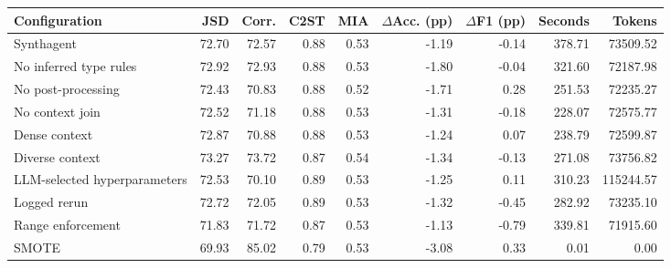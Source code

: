 \begin{tabular}{lrrrrrrrr}
\toprule
Configuration & JSD & Corr. & C2ST & MIA & $\Delta$Acc. (pp) & $\Delta$F1 (pp) & Seconds & Tokens \\
\midrule
Synthagent & 72.70 & 72.57 & 0.88 & 0.53 & -1.19 & -0.14 & 378.71 & 73509.52 \\
No inferred type rules & 72.92 & 72.93 & 0.88 & 0.53 & -1.80 & -0.04 & 321.60 & 72187.98 \\
No post-processing & 72.43 & 70.83 & 0.88 & 0.52 & -1.71 & 0.28 & 251.53 & 72235.27 \\
No context join & 72.52 & 71.18 & 0.88 & 0.53 & -1.31 & -0.18 & 228.07 & 72575.77 \\
Dense context & 72.87 & 70.88 & 0.88 & 0.53 & -1.24 & 0.07 & 238.79 & 72599.87 \\
Diverse context & 73.27 & 73.72 & 0.87 & 0.54 & -1.34 & -0.13 & 271.08 & 73756.82 \\
LLM-selected hyperparameters & 72.53 & 70.10 & 0.89 & 0.53 & -1.25 & 0.11 & 310.23 & 115244.57 \\
Logged rerun & 72.72 & 72.05 & 0.89 & 0.53 & -1.32 & -0.45 & 282.92 & 73235.10 \\
Range enforcement & 71.83 & 71.72 & 0.87 & 0.53 & -1.13 & -0.79 & 339.81 & 71915.60 \\
SMOTE & 69.93 & 85.02 & 0.79 & 0.53 & -3.08 & 0.33 & 0.01 & 0.00 \\
\bottomrule
\end{tabular}
